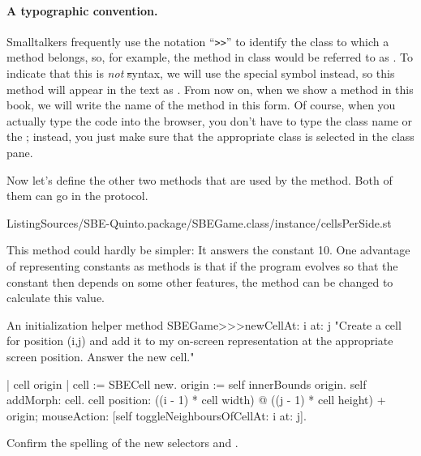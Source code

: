 \documentclass[a4paper,10pt,twoside]{book}
\begin{document}
\paragraph{A typographic convention.}
Smalltalkers frequently use the notation ``\verb|>>|'' to identify the class to which a method belongs, so, for example, the  method in class  would be referred to as .
To indicate that this is \emph{not} \st syntax, we will use the special symbol \ct{>>>} instead, so this method will appear in the text as .
From now on, when we show a method in this book, we will write the name of the method in this form.
Of course, when you actually type the code into the browser, you don't have to type the class name or the \ct{>>>}; instead, you just make sure that the appropriate class is selected in the class pane.  

Now let's define the other two methods that are used by the  method.
Both of them can go in the  protocol.

%
{ListingSources/SBE-Quinto.package/SBEGame.class/instance/cellsPerSide.st}	

This method could hardly be simpler:
It answers the constant 10.
One advantage of representing constants as methods is that if the program evolves so that the constant then depends on some other features, the method can be changed to calculate this value.

\begin{method}[newCellAt:at:]{An initialization helper method}
SBEGame>>>newCellAt: i at: j 
	"Create a cell for position (i,j) and add it to my on-screen
	representation at the appropriate screen position. Answer the new cell."

	| cell origin |
	cell := SBECell new.
	origin := self innerBounds origin.
	self addMorph: cell.
	cell 
		position: ((i - 1) * cell width) @ ((j - 1) * cell height) + origin;
		mouseAction: [self toggleNeighboursOfCellAt: i at: j].
\end{method}

Confirm the spelling of the new selectors  and .
\end{document}

